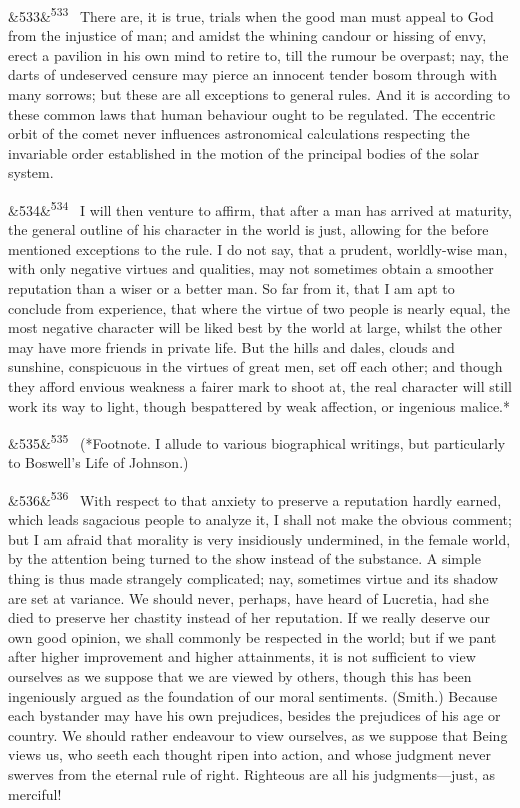 \documentclass[12pt]{article}
\newcommand{\para}[1][]{\par\noindent\ifx&#1&\else\textsuperscript{\footnotesize #1}~\fi}
\begin{document}
\para[533] There are, it is true, trials when the good man must appeal to God from the injustice of man; and amidst the whining candour or hissing of envy, erect a pavilion in his own mind to retire to, till the rumour be overpast; nay, the darts of undeserved censure may pierce an innocent tender bosom through with many sorrows; but these are all exceptions to general rules. And it is according to these common laws that human behaviour ought to be regulated. The eccentric orbit of the comet never influences astronomical calculations respecting the invariable order established in the motion of the principal bodies of the solar system.

\para[534] I will then venture to affirm, that after a man has arrived at maturity, the general outline of his character in the world is just, allowing for the before mentioned exceptions to the rule. I do not say, that a prudent, worldly-wise man, with only negative virtues and qualities, may not sometimes obtain a smoother reputation than a wiser or a better man. So far from it, that I am apt to conclude from experience, that where the virtue of two people is nearly equal, the most negative character will be liked best by the world at large, whilst the other may have more friends in private life. But the hills and dales, clouds and sunshine, conspicuous in the virtues of great men, set off each other; and though they afford envious weakness a fairer mark to shoot at, the real character will still work its way to light, though bespattered by weak affection, or ingenious malice.*

\para[535] (*Footnote. I allude to various biographical writings, but particularly to Boswell's Life of Johnson.)

\para[536] With respect to that anxiety to preserve a reputation hardly earned, which leads sagacious people to analyze it, I shall not make the obvious comment; but I am afraid that morality is very insidiously undermined, in the female world, by the attention being turned to the show instead of the substance. A simple thing is thus made strangely complicated; nay, sometimes virtue and its shadow are set at variance. We should never, perhaps, have heard of Lucretia, had she died to preserve her chastity instead of her reputation. If we really deserve our own good opinion, we shall commonly be respected in the world; but if we pant after higher improvement and higher attainments, it is not sufficient to view ourselves as we suppose that we are viewed by others, though this has been ingeniously argued as the foundation of our moral sentiments. (Smith.) Because each bystander may have his own prejudices, besides the prejudices of his age or country. We should rather endeavour to view ourselves, as we suppose that Being views us, who seeth each thought ripen into action, and whose judgment never swerves from the eternal rule of right. Righteous are all his judgments---just, as merciful!
\end{document}
